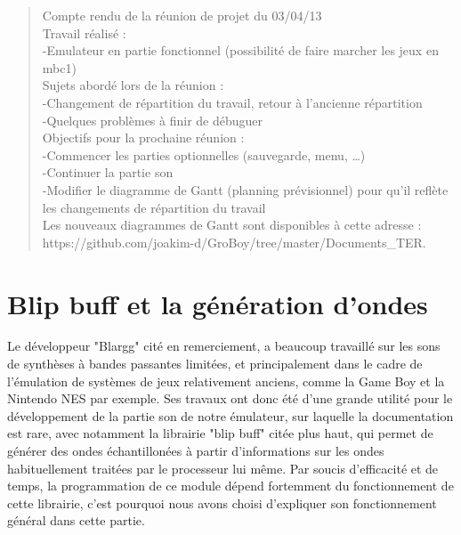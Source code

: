 \documentclass{report}
\begin{document}
\begin{quotation}
Compte rendu de la réunion de projet du 03/04/13\\
Travail réalisé :\\
	-Emulateur en partie fonctionnel (possibilité de faire marcher les jeux en mbc1)\\
Sujets abordé lors de la réunion :\\
	-Changement de répartition du travail, retour à l’ancienne répartition\\
	-Quelques problèmes à finir de débuguer\\
Objectifs pour la prochaine réunion :\\
	-Commencer les parties optionnelles (sauvegarde, menu, …)\\
	-Continuer la partie son\\
	-Modifier le diagramme de Gantt (planning prévisionnel) pour qu’il reflète les changements de répartition du travail\\
Les nouveaux diagrammes de Gantt sont disponibles à cette adresse : https://github.com/joakim-d/GroBoy/tree/master/Documents\_TER.\\
\end{quotation}
\chapter{Blip buff et la génération d'ondes}
Le développeur "Blargg" cité en remerciement, a beaucoup travaillé sur les sons de synthèses à bandes passantes limitées, et principalement dans le cadre de l'émulation de systèmes de jeux relativement anciens, comme la Game Boy et la Nintendo NES par exemple. Ses travaux ont donc été d'une grande utilité pour le développement de la partie son de notre émulateur, sur laquelle la documentation est rare, avec notamment la librairie "blip buff" citée plus haut, qui permet de générer des ondes échantillonées à partir d'informations sur les ondes habituellement traitées par le processeur lui même. Par soucis d'efficacité et de temps, la programmation de ce module dépend fortemment du fonctionnement de cette librairie, c'est pourquoi nous avons choisi d'expliquer son fonctionnement général dans cette partie.\\
\end{document}
